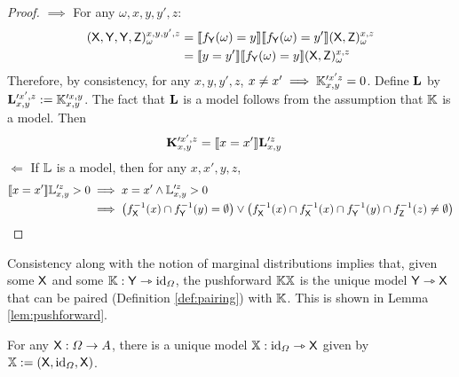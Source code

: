 \begin{proof}
$\implies$
For any $\omega,x,y,y',z$:
\begin{align}
	(\mathsf{X},\mathsf{Y},\mathsf{Y},\mathsf{Z})_\omega^{x,y,y',z} &= \llbracket f_{\mathsf{Y}}(\omega)=y \rrbracket \llbracket f_{\mathsf{Y}}(\omega)=y' \rrbracket (\mathsf{X},\mathsf{Z})_\omega^{x,z} \\
	&= \llbracket y=y' \rrbracket \llbracket f_{\mathsf{Y}}(\omega)=y \rrbracket(\mathsf{X},\mathsf{Z})_\omega^{x,z}
\end{align}
Therefore, by consistency, for any $x,y,y',z$, $x\neq x'\implies \mathbb{K}_{x,y}^{\prime x'z}=0$. Define $\mathbf{L}$ by $\mathbf{L}_{x,y}^{\prime x', z} := \mathbb{K}_{x,y}^{\prime x, y}$. The fact that $\mathbf{L}$ is a model follows from the assumption that $\mathbb{K}$ is a model. Then
\begin{align}
	\mathbf{K}_{x, y}^{\prime x', z} &= \llbracket x=x' \rrbracket\mathbf{L}_{x,y}^{\prime z}
\end{align}
$\Leftarrow$
If $\mathbb{L}$ is a model, then for any $x,x',y,z$, 
\begin{align}
\llbracket x=x'\rrbracket \mathbb{L}_{ x,y}^{\prime z}>0&\implies x=x'\land \mathbb{L}_{ x,y}^{\prime z}>0\\
													  &\implies \left( f_{\mathsf{X}}^{-1}(x)\cap f_{\mathsf{Y}}^{-1}(y)=\emptyset \right)\lor \left(f_{\mathsf{X}}^{-1}(x)\cap f_{\mathsf{X}}^{-1}(x)\cap f_{\mathsf{Y}}^{-1}(y)\cap f_{\mathsf{Z}}^{-1}(z)\neq\emptyset \right)\\
\end{align}
\end{proof}

Consistency along with the notion of marginal distributions implies that, given some $\mathsf{X}$ and some $\mathbb{K}:\mathsf{Y}\rightarrowtriangle\text{id}_\Omega$, the pushforward $\mathbb{K}\mathbb{X}$ is the unique model $\mathsf{Y}\rightarrowtriangle \mathsf{X}$ that can be paired (Definition \ref{def:pairing}) with $\mathbb{K}$. This is shown in Lemma \ref{lem:pushforward}.

\begin{lemma}\label{lem:uniq_model}
For any $\mathsf{X}:\Omega\to A$, there is a unique model $\mathbb{X}:\text{id}_\Omega\rightarrowtriangle \mathsf{X}$ given by $\mathbb{X}:=(\mathsf{X},\text{id}_\Omega,\mathsf{X})$.
\end{lemma}

